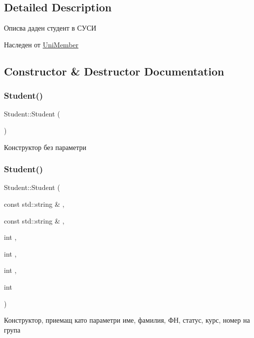 \subsection{Detailed Description}
Описва даден студент в СУСИ 

Наследен от \hyperlink{class_uni_member}{Uni\+Member} 

\subsection{Constructor \& Destructor Documentation}
\mbox{\label{class_student_af9168cedbfa5565cf0b20c1a9d3f5c9d}} 
\subsubsection{\texorpdfstring{Student()}{Student()}\hspace{0.1cm}{\footnotesize\ttfamily [1/4]}}
{\footnotesize\ttfamily Student\+::\+Student (\begin{DoxyParamCaption}{ }\end{DoxyParamCaption})}



Конструктор без параметри 

\mbox{\label{class_student_a65d6b3a714d5c60e8c9ffbc6d64f1a69}} 
\subsubsection{\texorpdfstring{Student()}{Student()}\hspace{0.1cm}{\footnotesize\ttfamily [2/4]}}
{\footnotesize\ttfamily Student\+::\+Student (\begin{DoxyParamCaption}\item[{const std\+::string \&}]{,  }\item[{const std\+::string \&}]{,  }\item[{int}]{,  }\item[{int}]{,  }\item[{int}]{,  }\item[{int}]{ }\end{DoxyParamCaption})}



Конструктор, приемащ като параметри име, фамилия, ФН, статус, курс, номер на група 

